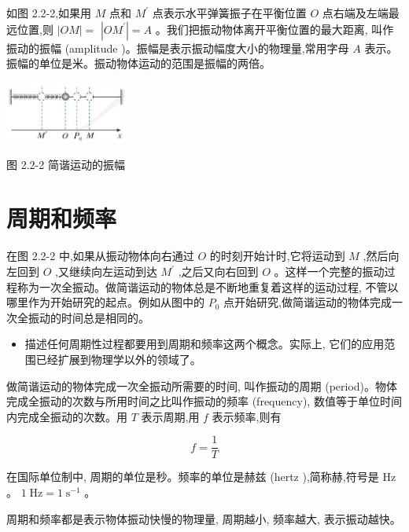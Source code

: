 \documentclass[10pt]{article}
\begin{document}
如图 2.2-2,如果用 \(M\) 点和 \({M}^{\prime }\) 点表示水平弹簧振子在平衡位置 \(O\) 点右端及左端最远位置,则 \(\left| {OM}\right| =\) \(\left| {O{M}^{\prime }}\right| = A\) 。我们把振动物体离开平衡位置的最大距离, 叫作振动的振幅 (amplitude )。振幅是表示振动幅度大小的物理量,常用字母 \(A\) 表示。振幅的单位是米。振动物体运动的范围是振幅的两倍。

\begin{center}
\includegraphics[max width=0.3\textwidth]{images/01910e4c-ebb8-7d2c-8f2f-2375bc1d2d12_41_771435.jpg}
\end{center}

图 2.2-2 简谐运动的振幅

\section*{周期和频率}

在图 2.2-2 中,如果从振动物体向右通过 \(O\) 的时刻开始计时,它将运动到 \(M\) ,然后向左回到 \(O\) ,又继续向左运动到达 \({M}^{\prime }\) ,之后又向右回到 \(O\) 。这样一个完整的振动过程称为一次全振动。做简谐运动的物体总是不断地重复着这样的运动过程, 不管以哪里作为开始研究的起点。例如从图中的 \({P}_{0}\) 点开始研究,做简谐运动的物体完成一次全振动的时间总是相同的。

\begin{mdframed}

\begin{itemize}
\item 描述任何周期性过程都要用到周期和频率这两个概念。实际上, 它们的应用范围已经扩展到物理学以外的领域了。
\end{itemize}

\end{mdframed}

做简谐运动的物体完成一次全振动所需要的时间, 叫作振动的周期 (period)。物体完成全振动的次数与所用时间之比叫作振动的频率 (frequency), 数值等于单位时间内完成全振动的次数。用 \(T\) 表示周期,用 \(f\) 表示频率,则有

\[
f = \frac{1}{T}
\]

在国际单位制中, 周期的单位是秒。频率的单位是赫兹 (hertz ),简称赫,符号是 \(\mathrm{{Hz}}\) 。 \(1\mathrm{\;{Hz}} = 1{\mathrm{\;s}}^{-1}\) 。

周期和频率都是表示物体振动快慢的物理量, 周期越小, 频率越大, 表示振动越快。
\end{document}
